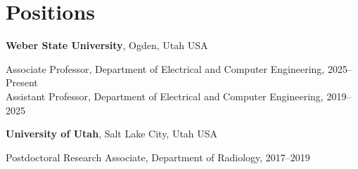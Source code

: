 \section{\sc Positions}

\textbf{Weber State University},
Ogden, Utah USA
\vspace{-0.5\baselineskip}

Associate Professor, Department of Electrical and Computer Engineering, 2025--Present\\
Assistant Professor, Department of Electrical and Computer Engineering, 2019--2025


\textbf{University of Utah},
Salt Lake City, Utah USA
\vspace{-0.5\baselineskip}

Postdoctoral Research Associate, Department of Radiology, 2017--2019

\endinput